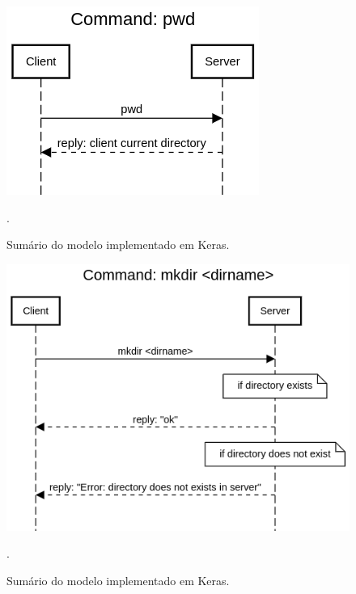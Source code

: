 \documentclass[conference]{IEEEtran}
\begin{document}
\begin{figure}[htbp]
\centering
\centerline{\includegraphics[scale=0.4]{diagrams/Command_pwd.png}}
\caption{Sumário do modelo implementado em Keras.}.
\label{summary}
\end{figure}

\begin{figure}[htbp]
\centering
\centerline{\includegraphics[scale=0.4]{diagrams/Command_mkdir_dirname.png}}
\caption{Sumário do modelo implementado em Keras.}.
\label{summary}
\end{figure}
\end{document}
